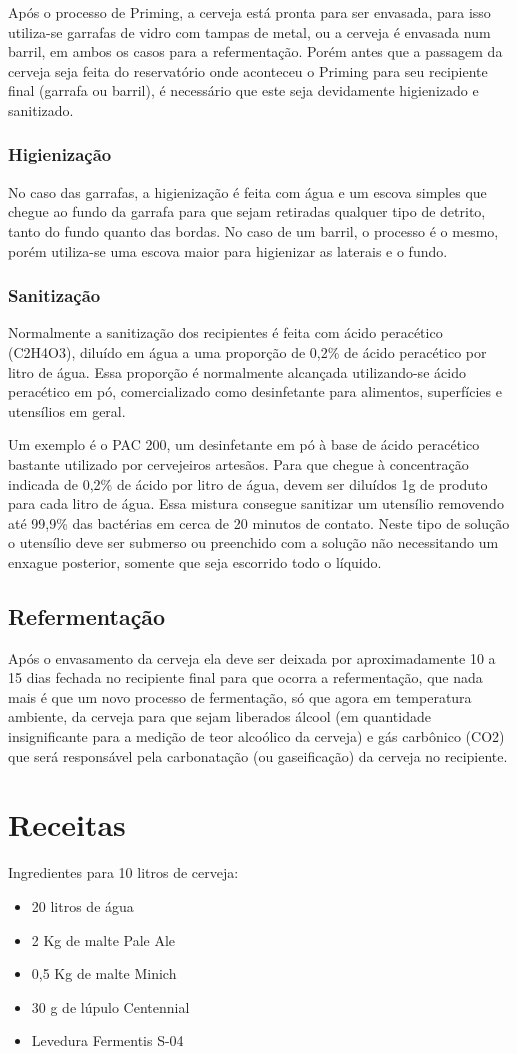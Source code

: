 Após o processo de Priming, a cerveja está pronta para ser envasada, para isso utiliza-se garrafas de vidro com tampas de metal, ou a cerveja é envasada num barril, em ambos os casos para a refermentação. Porém antes que a passagem da cerveja seja feita do reservatório onde aconteceu o Priming para seu recipiente final (garrafa ou barril), é necessário que este seja devidamente higienizado e sanitizado.

\subsubsection{Higienização}

No caso das garrafas, a higienização é feita com água e um escova simples que chegue ao fundo da garrafa para que sejam retiradas qualquer tipo de detrito, tanto do fundo quanto das bordas. No caso de um barril, o processo é o mesmo, porém utiliza-se uma escova maior para higienizar as laterais e o fundo.

\subsubsection{Sanitização}

Normalmente a sanitização dos recipientes é feita com ácido peracético (C2H4O3), diluído em água a uma proporção de 0,2\% de ácido peracético por litro de água. Essa proporção é normalmente alcançada utilizando-se ácido peracético em pó, comercializado como desinfetante para alimentos, superfícies e utensílios em geral.

Um exemplo é o PAC 200, um desinfetante em pó à base de ácido peracético bastante utilizado por cervejeiros artesãos. Para que chegue à concentração indicada de 0,2\% de ácido por litro de água, devem ser diluídos 1g de produto para cada litro de água. Essa mistura consegue sanitizar um utensílio removendo até 99,9\% das bactérias em cerca de 20 minutos de contato. Neste tipo de solução o utensílio deve ser submerso ou preenchido com a solução não necessitando um enxague posterior, somente que seja escorrido todo o líquido.

\subsection{Refermentação}
Após o envasamento da cerveja ela deve ser deixada por aproximadamente 10 a 15 dias fechada no recipiente final para que ocorra a refermentação, que nada mais é que um novo processo de fermentação, só que agora em temperatura ambiente, da cerveja para que sejam liberados álcool (em quantidade insignificante para a medição de teor alcoólico da cerveja) e gás carbônico (CO2) que será responsável pela carbonatação (ou gaseificação) da cerveja no recipiente.

\section{Receitas}

Ingredientes para 10 litros de cerveja:

 \begin{itemize}
    \item 20 litros de água
    \item 2 Kg de malte Pale Ale
    \item 0,5 Kg de malte Minich
    \item 30 g de lúpulo Centennial
    \item Levedura Fermentis S-04
 \end{itemize}
